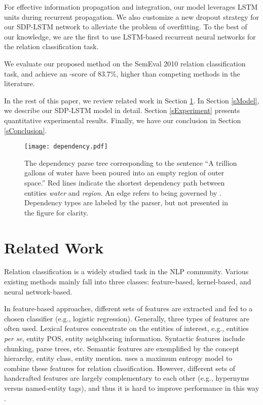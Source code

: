 \documentclass[11pt,a4paper]{article}
\begin{document}
For effective information propagation and integration,
our model leverages LSTM units during recurrent propagation.
We also customize a new dropout strategy
for our SDP-LSTM network to alleviate the problem of overfitting.
To the best of our knowledge, we are the first to use
LSTM-based recurrent neural networks for the relation classification task.

We evaluate our proposed method on the SemEval
2010 relation classification task,
and achieve an -score of 83.7\%, higher than
competing methods in the literature.

In the rest of this paper, we 
review related work in Section \ref{sRelatedwork}.
In Section \ref{sModel}, we describe our SDP-LSTM model in detail.
Section \ref{sExperiment} presents quantitative experimental results.
Finally, we have our conclusion in Section \ref{sConclusion}.



\begin{figure}[!t]
\centering
\texttt{[image: dependency.pdf]}
\caption{The dependency parse tree corresponding to the sentence
``A trillion gallons of water have been poured
into an empty region of outer space.'' Red lines indicate the shortest dependency path
 between entities \textit{water} and \textit{region}. 
 An edge  refers to  being governed by . 
 Dependency types are labeled by the parser, but not presented in the figure for clarity.}\label{fDependency}
\end{figure}

\section{Related Work}\label{sRelatedwork}

Relation classification is a widely studied task in the NLP community.
Various existing methods mainly fall into three classes:
feature-based, kernel-based, and neural network-based.

In feature-based approaches,
different sets of features are extracted
and fed to a chosen classifier (e.g., logistic regression).
Generally, three types of features are often used.
Lexical features concentrate on the entities of interest,
e.g., entities \textit{per se}, entity POS,
entity neighboring information.
Syntactic features include chunking, parse trees, etc.
Semantic features are exemplified by
the concept hierarchy, entity class, entity mention.
 uses a maximum entropy model
to combine these features for relation classification.
However, different sets of handcrafted features are largely complementary to each other
(e.g., hypernyms versus named-entity tags),
and thus it is hard to improve performance in this way \cite{REknowledge}.
\end{document}
